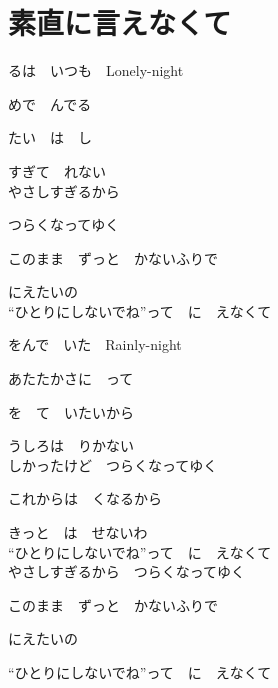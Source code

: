 \section{ 素直に言えなくて}
\large{

るは　いつも　Lonely-night

めで　んでる

たい　は　し

すぎて　れない
\\

やさしすぎるから

つらくなってゆく

このまま　ずっと　かないふりで

にえたいの
\\

“ひとりにしないでね”って　に　えなくて
\\


をんで　いた　Rainly-night

あたたかさに　って

を　て　いたいから

うしろは　りかない
\\

しかったけど　つらくなってゆく

これからは　くなるから

きっと　は　せないわ
\\

“ひとりにしないでね”って　に　えなくて
\\

やさしすぎるから　つらくなってゆく

このまま　ずっと　かないふりで

にえたいの

“ひとりにしないでね”って　に　えなくて

}